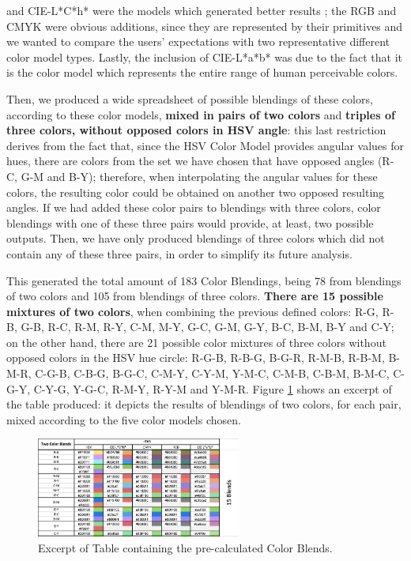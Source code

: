 and CIE-L*C*h* were the models which generated better results \cite{Gama20141,Gama20142}; the RGB and CMYK were obvious
additions, since they are represented by their primitives and we wanted to compare the users' expectations with two
representative different color model types. Lastly, the inclusion of CIE-L*a*b* was due to the fact
that it is the color model which represents the entire range of human perceivable colors. \par
%
Then, we produced a wide spreadsheet of possible blendings of these colors, according to these color models, \textbf{mixed in
pairs of two colors} and \textbf{triples of three colors, without opposed colors in HSV angle}: this last restriction derives
from the fact that, since the HSV Color Model provides angular values for hues, there are colors from the set we have chosen
that have opposed angles (R-C, G-M and B-Y); therefore, when interpolating the angular values for these colors, the resulting color
could be obtained on another two opposed resulting angles. If we had added these color pairs to blendings with three colors,
color blendings with one of these three pairs would provide, at least, two possible outputs. Then, we have only produced blendings
of three colors which did not contain any of these three pairs, in order to simplify its future analysis. \par
%
This generated the total amount of 183 Color Blendings, being 78 from blendings of two colors and 105 from blendings of three colors. \textbf{There are 15
possible mixtures of two colors}, when combining the previous defined colors: R-G, R-B, G-B, R-C, R-M, R-Y, C-M, M-Y, G-C, G-M,
G-Y, B-C, B-M, B-Y and C-Y; on the other hand, there are 21 possible color mixtures of three colors without opposed colors in the
HSV hue circle: R-G-B, R-B-G, B-G-R, R-M-B, R-B-M, B-M-R, C-G-B, C-B-G, B-G-C, C-M-Y, C-Y-M, Y-M-C, C-M-B, C-B-M, B-M-C, C-G-Y,
C-Y-G, Y-G-C, R-M-Y, R-Y-M and Y-M-R. Figure \ref{fig:table_blends} shows an excerpt of the table produced: it depicts the results
of blendings of two colors, for each pair, mixed according to the five color models chosen.
%
\begin{figure}[htbp]
	\centering
  \includegraphics[width=0.6\textwidth]{images/implementation/table_blends.png}
  \caption[Excerpt of Table containing the pre-calculated Color Blends.]{Excerpt of Table containing the pre-calculated Color Blends.}
  \label{fig:table_blends}
\end{figure} \par
